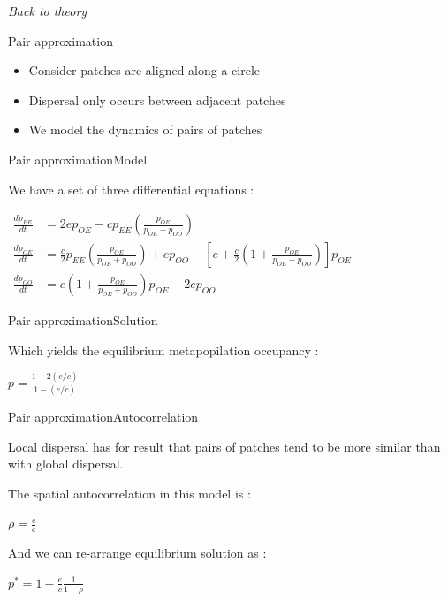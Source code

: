 \documentclass[10pt,aspectratio=149]{beamer}
\newcommand{\keyeq}[1]{%
  \begin{center}
    \Large$\displaystyle #1$
  \end{center}%
}
\newcommand{\keyeqs}[1]{%
  \begin{center}
    \normalsize$\displaystyle
    \begin{aligned}
    #1
    \end{aligned}
    $
  \end{center}%
}
\begin{document}

{
\usebackgroundtemplate{}
\begin{frame}

	\pagecolor{BDQC1st}
	\color{white}

	\LARGE{\textit{Back to theory}}

\end{frame}
}


\begin{frame}{Pair approximation}

    \begin{itemize}
        \item Consider patches are aligned along a circle
        \item Dispersal only occurs between adjacent patches
        \item We model the dynamics of pairs of patches
    \end{itemize}
    
\end{frame}


\begin{frame}{Pair approximation}{Model}

    We have a set of three differential equations :

    \keyeqs{
    \frac{dp_{EE}}{dt} &= 2ep_{OE}-cp_{EE}\left(\frac{p_{OE}}{p_{OE}+p_{OO}}\right)\\[4pt]
    \frac{dp_{OE}}{dt} &= \frac{c}{2}p_{EE}\left(\frac{p_{OE}}{p_{OE}+p_{OO}}\right)+ep_{OO}-\left[e+\frac{c}{2}\left(1+\frac{p_{OE}}{p_{OE}+p_{OO}}\right)\right]p_{OE}\\[4pt]
    \frac{dp_{OO}}{dt} &= c\left(1+\frac{p_{OE}}{p_{OE}+p_{OO}}\right)p_{OE}-2ep_{OO}
    }
\end{frame}


\begin{frame}{Pair approximation}{Solution}

    Which yields the equilibrium metapopilation occupancy :

    \keyeq{p = \frac{1-2(e/c)}{1-(e/c)}}
\end{frame}


\begin{frame}{Pair approximation}{Autocorrelation}

    Local dispersal has for result that pairs of patches tend to be more similar than with global dispersal. 

    The spatial autocorrelation in this model is :

    \keyeq{\rho = \frac{e}{c}}

    And we can re-arrange equilibrium solution as :

    \keyeq{p^* = 1 - \frac{e}{c}\frac{1}{1-\rho}}

\end{frame}
\end{document}
